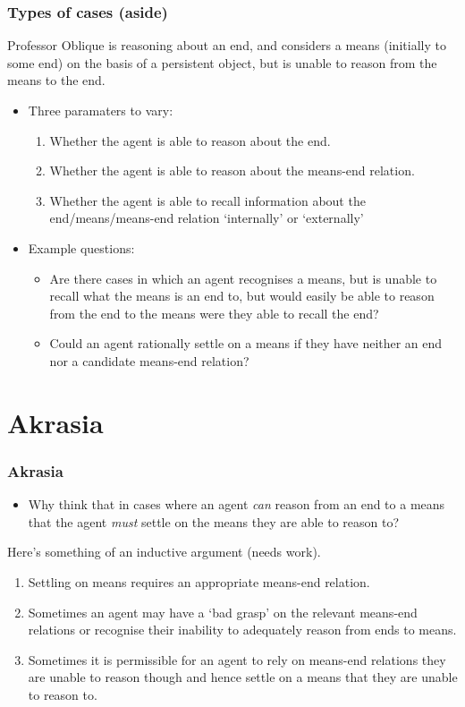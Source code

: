 \documentclass[noamssymb,
]{beamer} %
\newcommand{\hand}{\ding{43}}
\begin{document}
\begin{frame}
  \frametitle{Types of cases (aside)}

  Professor Oblique is reasoning about an end, and considers a means (initially to some end) on the basis of a persistent object, but is unable to reason from the means to the end.
  \begin{itemize}
  \item Three paramaters to vary:
    \begin{enumerate}
    \item Whether the agent is able to reason about the end.
    \item Whether the agent is able to reason about the means-end relation.
    \item Whether the agent is able to recall information about the end/means/means-end relation `internally' or `externally'
    \end{enumerate}
  \item Example questions:
    \begin{itemize}
    \item Are there cases in which an agent recognises a means, but is unable to recall what the means is an end to, but would easily be able to reason from the end to the means were they able to recall the end?
    \item Could an agent rationally settle on a means if they have neither an end nor a candidate means-end relation?
    \end{itemize}
  \end{itemize}
\end{frame}



\section{Akrasia}
\label{sec:akrasia}

\begin{frame}
  \frametitle{Akrasia}

  \begin{itemize}
  \item[\hand] Why think that in cases where an agent \emph{can} reason from an end to a means that the agent \emph{must} settle on the means they are able to reason to?
  \end{itemize}

  Here's something of an inductive argument (needs work).

\begin{enumerate}
\item Settling on means requires an appropriate means-end relation.
\item Sometimes an agent may have a `bad grasp' on the relevant means-end relations or recognise their inability to adequately reason from ends to means.
\item Sometimes it is permissible for an agent to rely on means-end relations they are unable to reason though and hence settle on a means that they are unable to reason to.
\end{enumerate}
\end{frame}
\end{document}
